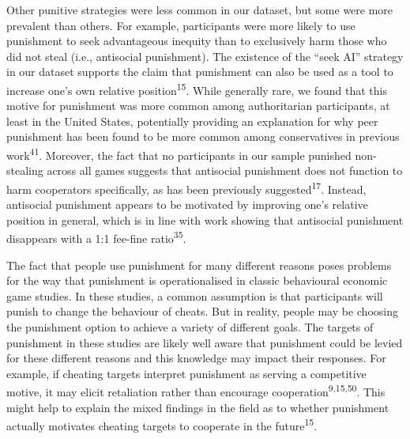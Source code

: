 \documentclass[
  man,floatsintext]{apa6}
\begin{document}
Other punitive strategies were less common in our dataset, but some were more
prevalent than others. For example, participants were more likely to use
punishment to seek advantageous inequity than to exclusively harm those who did
not steal (i.e., antisocial punishment). The existence of the ``seek AI'' strategy
in our dataset supports the claim that punishment can also be used as a tool to
increase one's own relative position\textsuperscript{15}. While generally rare, we
found that this motive for punishment was more common among authoritarian
participants, at least in the United States, potentially providing an
explanation for why peer punishment has been found to be more common among
conservatives in previous work\textsuperscript{41}. Moreover, the fact that no
participants in our sample punished non-stealing across all games suggests that
antisocial punishment does not function to harm cooperators specifically, as has
been previously suggested\textsuperscript{17}. Instead, antisocial punishment appears
to be motivated by improving one's relative position in general, which is in
line with work showing that antisocial punishment disappears with a 1:1 fee-fine
ratio\textsuperscript{35}.

The fact that people use punishment for many different reasons poses problems
for the way that punishment is operationalised in classic behavioural economic
game studies. In these studies, a common assumption is that participants will
punish to change the behaviour of cheats. But in reality, people may be choosing
the punishment option to achieve a variety of different goals. The targets of
punishment in these studies are likely well aware that punishment could be
levied for these different reasons and this knowledge may impact their
responses. For example, if cheating targets interpret punishment as serving a
competitive motive, it may elicit retaliation rather than encourage
cooperation\textsuperscript{9,15,50}. This might help to
explain the mixed findings in the field as to whether punishment actually
motivates cheating targets to cooperate in the future\textsuperscript{15}.
\end{document}
